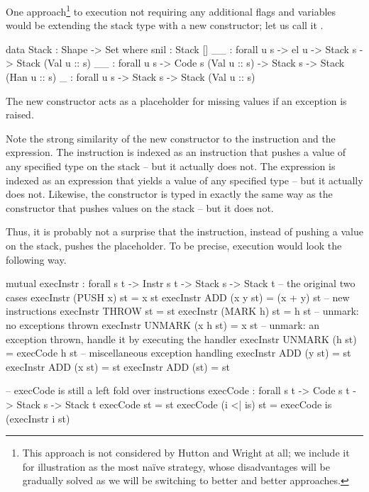 One approach\footnote{This approach is not considered by Hutton and Wright at all;
we include it for illustration as the most na\"{i}ve strategy, whose disadvantages
will be gradually solved as we will be switching to better and better approaches.}
to execution not requiring any additional flags and variables
would be extending the stack type with a new constructor; let us call it
\ident{\void\scons\!\!\_}.
\begin{code}
  data Stack : Shape -> Set where
    snil : Stack []
    _\scons\_ : forall {u s} -> el u -> Stack s -> Stack (Val u :: s)
    _\sconsh\_ : forall {u s} -> Code s (Val u :: s) -> Stack s -> Stack (Han u :: s)
    \void\scons\_ : forall {u s} -> Stack s -> Stack (Val u :: s)
\end{code}
The new constructor acts as a placeholder for missing values if an exception is raised.

Note the strong similarity of the new constructor \ident{\void\scons\_} to the
 instruction and the 
expression. The instruction  is indexed as an instruction that pushes
a value of any specified type on the stack -- but it actually does not. The 
 expression is indexed as an expression that yields a value of any specified
type -- but it actually does not. Likewise, the \ident{\void} constructor is typed in
exactly the same way as the constructor that pushes values on the stack -- but it does not.

Thus, it is probably not a surprise that the  instruction, instead of pushing
a value on the stack, pushes the \ident{\void} placeholder. To be precise, execution would
look the following way. \label{sec:placeholder}
\begin{code}
  mutual
    execInstr : forall {s t} -> Instr s t -> Stack s -> Stack t
    -- the original two cases
    execInstr (PUSH x) st = x \scons st
    execInstr ADD (x \scons y \scons st) = (x + y) \scons st
    -- new instructions
    execInstr THROW st = \void\scons st
    execInstr (MARK h) st = h \sconsh st
    -- unmark: no exceptions thrown
    execInstr UNMARK (x \scons h \sconsh st) = x \scons st
    -- unmark: an exception thrown, handle it by executing the handler
    execInstr UNMARK (\void\scons h \sconsh st) = execCode h st
    -- miscellaneous exception handling
    execInstr ADD (\void\scons y \scons st) = \void\scons st
    execInstr ADD (x \scons \void\scons st) = \void\scons st
    execInstr ADD (\void\scons \void\scons st) = \void\scons st

    -- execCode is still a left fold over instructions
    execCode : forall {s t} -> Code s t -> Stack s -> Stack t
    execCode \nil st = st
    execCode (i <| is) st = execCode is (execInstr i st)
\end{code}

